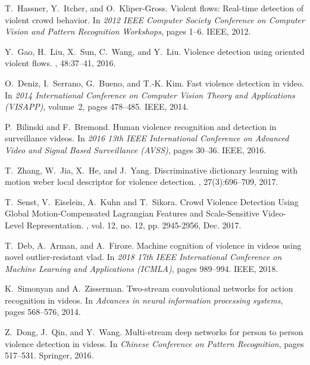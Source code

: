 \documentclass[10pt,twocolumn,letterpaper]{article}
\begin{document}
{\begin{thebibliography}{10}
T.~Hassner, Y.~Itcher, and O.~Kliper-Gross.
\newblock Violent flows: Real-time detection of violent crowd behavior.
\newblock In {\em 2012 IEEE Computer Society Conference on Computer Vision and Pattern Recognition Workshops}, pages 1--6. IEEE, 2012.

Y.~Gao, H.~Liu, X.~Sun, C.~Wang, and Y.~Liu.
\newblock Violence detection using oriented violent flows.
, 48:37--41, 2016.

O.~Deniz, I.~Serrano, G.~Bueno, and T.-K. Kim.
\newblock Fast violence detection in video.
\newblock In {\em 2014 International Conference on Computer Vision Theory and Applications (VISAPP)}, volume~2, pages 478--485. IEEE, 2014.

P.~Bilinski and F.~Bremond.
\newblock Human violence recognition and detection in surveillance videos.
\newblock In {\em 2016 13th IEEE International Conference on Advanced Video and Signal Based Surveillance (AVSS)}, pages 30--36. IEEE, 2016.

T.~Zhang, W.~Jia, X.~He, and J.~Yang.
\newblock Discriminative dictionary learning with motion weber local descriptor for violence detection.
, 27(3):696--709, 2017.

T.~Senst, V.~Eiselein, A.~Kuhn and T.~Sikora.
\newblock Crowd Violence Detection Using Global Motion-Compensated Lagrangian Features and Scale-Sensitive Video-Level Representation.
, vol. 12, no. 12, pp. 2945-2956, Dec. 2017.

T.~Deb, A.~Arman, and A.~Firoze.
\newblock Machine cognition of violence in videos using novel outlier-resistant vlad.
\newblock In {\em 2018 17th IEEE International Conference on Machine Learning and Applications (ICMLA)}, pages 989--994. IEEE, 2018.

K.~Simonyan and A.~Zisserman.
\newblock Two-stream convolutional networks for action recognition in videos.
\newblock In {\em Advances in neural information processing systems}, pages 568--576, 2014.

Z.~Dong, J.~Qin, and Y.~Wang.
\newblock Multi-stream deep networks for person to person violence detection in videos.
\newblock In {\em Chinese Conference on Pattern Recognition}, pages 517--531. Springer, 2016.


\end{thebibliography}}
\end{document}
